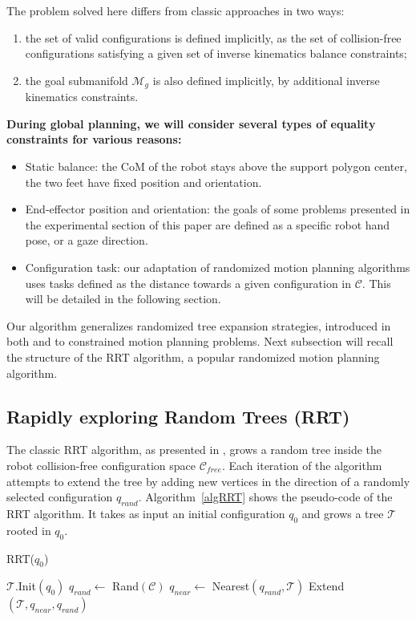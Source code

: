 \documentclass{article}
\newcommand\goalmanifold{\mathcal{M}_{g}}
\begin{document}
The problem solved here differs from classic approaches in two ways:
\begin{enumerate}
\item the set of valid configurations is defined implicitly, as the
  set of collision-free configurations satisfying a given set of
  inverse kinematics balance constraints;
\item the goal submanifold $\goalmanifold$ is also defined implicitly,
  by additional inverse kinematics constraints.
\end{enumerate}
\textbf{During global planning, we will consider several types of
equality constraints for various reasons:}
\begin{itemize}
\item Static balance: the CoM of the robot stays above
  the support polygon center, the two feet have fixed position and
  orientation.
\item End-effector position and orientation: the goals of some problems presented
  in the experimental section of this paper are defined as a specific robot hand pose,
  or a gaze direction.
\item Configuration task: our adaptation of randomized motion planning algorithms 
  uses tasks defined as the distance towards a given configuration in $\mathcal{C}$. 
  This will be detailed in the following section.
\end{itemize}


Our algorithm generalizes randomized tree expansion strategies, introduced in both \cite{HsuLat99c} and
\cite{kuffner00rrtconnect} to constrained motion planning problems. Next subsection will recall the structure of the RRT algorithm,
a popular randomized motion planning algorithm.


\subsection{Rapidly exploring Random Trees (RRT)}

The classic RRT algorithm, as presented in  \cite{kuffner00rrtconnect}, grows 
a random tree inside the robot 
collision-free configuration space 
$\mathcal{C}_{free}$. Each iteration of the algorithm attempts to extend the tree
by adding new vertices in the direction of a randomly selected configuration
$q_{rand}$. Algorithm~\ref{algRRT} shows the pseudo-code of the RRT algorithm.
It takes as input an initial configuration $q_0$ and grows a tree  $\mathcal{T}$ rooted 
in $q_0$. 

\begin{algorithm}
\caption{RRT($q_0$)}
\label{algRRT}
\begin{algorithmic}
\STATE $\mathcal{T}.$Init$(q_0)$
\STATE $q_{rand} \leftarrow $ Rand$(\mathcal{C})$
\STATE $q_{near} \leftarrow $ Nearest$(q_{rand},\mathcal{T})$
\STATE Extend$(\mathcal{T},q_{near},q_{rand})$
\ENDFOR

\end{algorithmic}
\end{algorithm}
\end{document}
